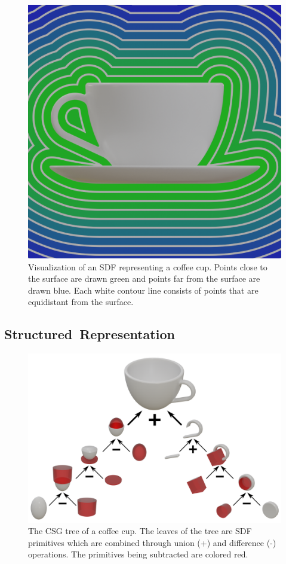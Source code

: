 \begin{figure}[h]
	\centering
	\includegraphics[scale=0.2]{Images/SDF Cup}
	\caption{Visualization of an SDF representing a coffee cup. Points close to the surface are drawn green and points far from the surface are drawn blue. Each white contour line consists of points that are equidistant from the surface.}
	\label{fig:sdf_cup}
\end{figure}

\subsection{Structured~Representation}
\label{subsec:structured_representation}

\begin{figure}[h]
	\centering
	\includegraphics[scale=0.5]{Images/CSG Cup}
	\caption{The CSG tree of a coffee cup. The leaves of the tree are SDF primitives which are combined through union (+) and difference (-) operations. The primitives being subtracted are colored red.}
	\label{fig:csg_cup}
\end{figure}


